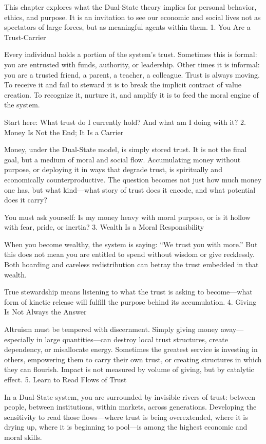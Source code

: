 \documentclass[11pt,oneside]{book}
\begin{document}
This chapter explores what the Dual-State theory implies for personal behavior, ethics, and purpose. It is an invitation to see our economic and social lives not as spectators of large forces, but as meaningful agents within them.
1. You Are a Trust-Carrier

Every individual holds a portion of the system’s trust. Sometimes this is formal: you are entrusted with funds, authority, or leadership. Other times it is informal: you are a trusted friend, a parent, a teacher, a colleague. Trust is always moving. To receive it and fail to steward it is to break the implicit contract of value creation. To recognize it, nurture it, and amplify it is to feed the moral engine of the system.

Start here: What trust do I currently hold? And what am I doing with it?
2. Money Is Not the End; It Is a Carrier

Money, under the Dual-State model, is simply stored trust. It is not the final goal, but a medium of moral and social flow. Accumulating money without purpose, or deploying it in ways that degrade trust, is spiritually and economically counterproductive. The question becomes not just how much money one has, but what kind—what story of trust does it encode, and what potential does it carry?

You must ask yourself: Is my money heavy with moral purpose, or is it hollow with fear, pride, or inertia?
3. Wealth Is a Moral Responsibility

When you become wealthy, the system is saying: “We trust you with more.” But this does not mean you are entitled to spend without wisdom or give recklessly. Both hoarding and careless redistribution can betray the trust embedded in that wealth.

True stewardship means listening to what the trust is asking to become—what form of kinetic release will fulfill the purpose behind its accumulation.
4. Giving Is Not Always the Answer

Altruism must be tempered with discernment. Simply giving money away—especially in large quantities—can destroy local trust structures, create dependency, or misallocate energy. Sometimes the greatest service is investing in others, empowering them to carry their own trust, or creating structures in which they can flourish. Impact is not measured by volume of giving, but by catalytic effect.
5. Learn to Read Flows of Trust

In a Dual-State system, you are surrounded by invisible rivers of trust: between people, between institutions, within markets, across generations. Developing the sensitivity to read those flows—where trust is being overextended, where it is drying up, where it is beginning to pool—is among the highest economic and moral skills.
\end{document}
